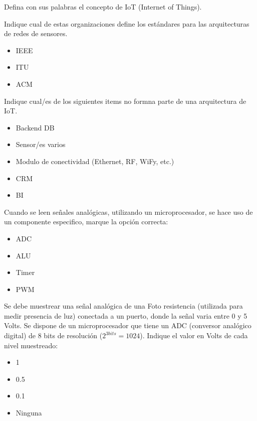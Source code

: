 \documentclass[11pt]{exam}
\begin{document}
%
%
%

\begin{questions}

\addpoints
\question[1] Defina con sus palabras el concepto de IoT (Internet of Things).
\vspace{1in}

\addpoints
\question[1] Indique cual de estas organizaciones define los estándares para las arquitecturas de redes de sensores.
\begin{itemize}
\item IEEE
\item ITU
\item ACM
\end{itemize}

\addpoints
\question[1] Indique cual/es de los siguientes items no formna parte de una arquitectura de IoT.
\begin{itemize}
\item Backend DB
\item Sensor/es varios
\item Modulo de conectividad (Ethernet, RF, WiFy, etc.)
\item CRM
\item BI
\end{itemize}

\addpoints
\question[1] Cuando se leen señales analógicas, utilizando un microprocesador, se hace uso de un componente especifico, marque la opción correcta:
\begin{itemize}
\item ADC
\item ALU
\item Timer
\item PWM
\end{itemize}

\addpoints
\question[1] Se debe muestrear una señal analógica de una Foto resistencia (utilizada para medir presencia de luz) conectada a un puerto, donde la señal varia entre 0 y 5 Volts. Se dispone de un microprocesador que tiene un ADC (conversor analógico digital) de 8 bits de resolución ($2^{3bits}=1024$). Indique el valor en Volts de cada nivel muestreado:
\begin{itemize}
\item 1
\item 0.5
\item 0.1
\item Ninguna
\end{itemize}


\end{questions}
\end{document}

